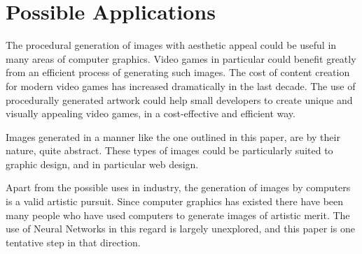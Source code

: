 \documentclass{acm_proc_article-sp}
\begin{document}
\section{Possible Applications}
\label{sec:appl}

The procedural generation of images with aesthetic appeal could be useful in many areas of computer graphics. Video games in particular could benefit greatly from an efficient process of generating such images. The cost of content creation for modern video games has increased dramatically in the last decade. The use of procedurally generated artwork could help small developers to create unique and visually appealing video games, in a cost-effective and efficient way. 

\vspace{3mm}

Images generated in a manner like the one outlined in this paper, are by their nature, quite abstract. These types of images could be particularly suited to graphic design, and in particular web design. 

\vspace{3mm}

Apart from the possible uses in industry, the generation of images by computers is a valid artistic pursuit. Since computer graphics has existed there have been many people who have used computers to generate images of artistic merit. The use of Neural Networks in this regard is largely unexplored, and this paper is one tentative step in that direction.



\end{document}
